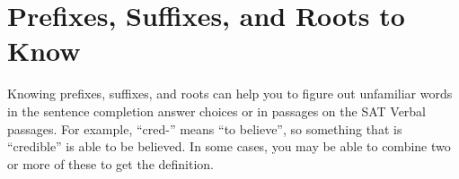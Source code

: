\section{Prefixes, Suffixes, and Roots to Know}

Knowing prefixes, suffixes, and roots can help you to figure out unfamiliar words in the sentence
completion answer choices or in passages on the SAT Verbal passages. For example, ``cred-'' means
``to believe'', so something that is ``credible'' is able to be believed. In some cases, you may be
able to combine two or more of these to get the definition.
